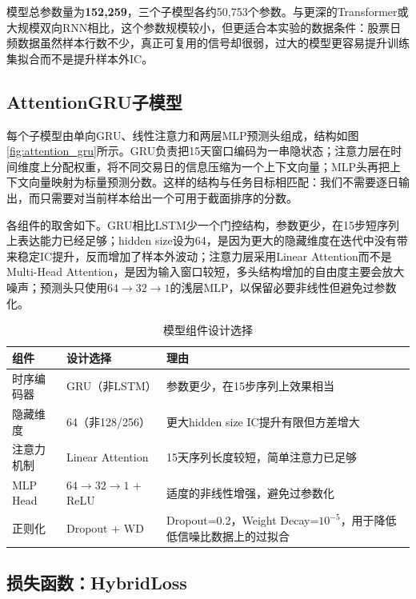 \documentclass[10pt,a4paper]{ctexart}
\begin{document}
模型总参数量为\textbf{152,259}，三个子模型各约50,753个参数。与更深的Transformer或大规模双向RNN相比，这个参数规模较小，但更适合本实验的数据条件：股票日频数据虽然样本行数不少，真正可复用的信号却很弱，过大的模型更容易提升训练集拟合而不是提升样本外IC。

\subsection{AttentionGRU子模型}

每个子模型由单向GRU、线性注意力和两层MLP预测头组成，结构如图\ref{fig:attention_gru}所示。GRU负责把15天窗口编码为一串隐状态；注意力层在时间维度上分配权重，将不同交易日的信息压缩为一个上下文向量；MLP头再把上下文向量映射为标量预测分数。这样的结构与任务目标相匹配：我们不需要逐日输出，而只需要对当前样本给出一个可用于截面排序的分数。

各组件的取舍如下。GRU相比LSTM少一个门控结构，参数更少，在15步短序列上表达能力已经足够；hidden size设为64，是因为更大的隐藏维度在迭代中没有带来稳定IC提升，反而增加了样本外波动；注意力层采用Linear Attention而不是Multi-Head Attention，是因为输入窗口较短，多头结构增加的自由度主要会放大噪声；预测头只使用$64 \rightarrow 32 \rightarrow 1$的浅层MLP，以保留必要非线性但避免过参数化。

\begin{table}[htbp]
    \centering
    \caption{模型组件设计选择}
    \small
    \begin{tabular}{p{2.5cm}p{3.5cm}p{7.0cm}}
        \toprule
        组件 & 设计选择 & 理由 \\
        \midrule
        时序编码器 & GRU（非LSTM） & 参数更少，在15步序列上效果相当 \\
        隐藏维度 & 64（非128/256） & 更大hidden size IC提升有限但方差增大 \\
        注意力机制 & Linear Attention & 15天序列长度较短，简单注意力已足够 \\
        MLP Head & $64\to32\to1$ + ReLU & 适度的非线性增强，避免过参数化 \\
        正则化 & Dropout + WD & Dropout=0.2，Weight Decay=$10^{-5}$，用于降低低信噪比数据上的过拟合 \\
        \bottomrule
    \end{tabular}
\end{table}

\subsection{损失函数：HybridLoss}
\end{document}
